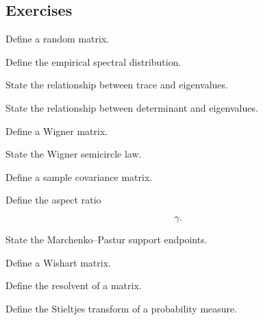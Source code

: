 \subsection{Exercises}
\label{subsec:rmt-exercises}

\begin{exercise}[1]
Define a random matrix.
\end{exercise}

\begin{exercise}[1]
Define the empirical spectral distribution.
\end{exercise}

\begin{exercise}[1]
State the relationship between trace and eigenvalues.
\end{exercise}

\begin{exercise}[1]
State the relationship between determinant and eigenvalues.
\end{exercise}

\begin{exercise}[1]
Define a Wigner matrix.
\end{exercise}

\begin{exercise}[1]
State the Wigner semicircle law.
\end{exercise}

\begin{exercise}[1]
Define a sample covariance matrix.
\end{exercise}

\begin{exercise}[1]
Define the aspect ratio

\[
\gamma.
\]
\end{exercise}

\begin{exercise}[1]
State the Marchenko--Pastur support endpoints.
\end{exercise}

\begin{exercise}[1]
Define a Wishart matrix.
\end{exercise}

\begin{exercise}[1]
Define the resolvent of a matrix.
\end{exercise}

\begin{exercise}[1]
Define the Stieltjes transform of a probability measure.
\end{exercise}

